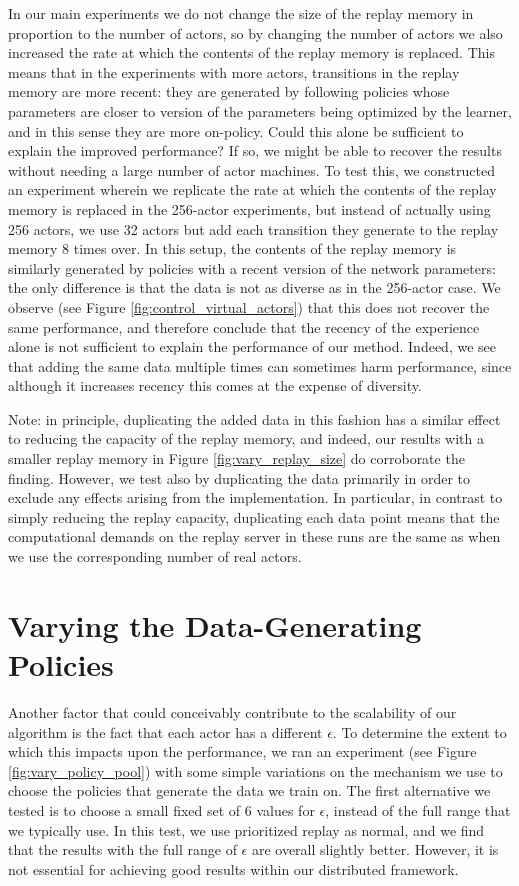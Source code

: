 \documentclass{article} \PassOptionsToPackage{usenames,dvipsnames}{xcolor}
\begin{document}
In our main experiments we do not change the size of the replay memory in proportion to the number of actors, so by changing the number of actors we also increased the rate at which the contents of the replay memory is replaced. This means that in the experiments with more actors, transitions in the replay memory are more recent: they are generated by following policies whose parameters are closer to version of the parameters being optimized by the learner, and in this sense they are more on-policy. Could this alone be sufficient to explain the improved performance? If so, we might be able to recover the results without needing a large number of actor machines. To test this, we constructed an experiment wherein we replicate the rate at which the contents of the replay memory is replaced in the 256-actor experiments, but instead of actually using 256 actors, we use 32 actors but add each transition they generate to the replay memory 8 times over. In this setup, the contents of the replay memory is similarly generated by policies with a recent version of the network parameters: the only difference is that the data is not as diverse as in the 256-actor case. We observe (see Figure \ref{fig:control_virtual_actors}) that this does not recover the same performance, and therefore conclude that the recency of the experience alone is not sufficient to explain the performance of our method. Indeed, we see that adding the same data multiple times can sometimes harm performance, since although it increases recency this comes at the expense of diversity.

Note: in principle, duplicating the added data in this fashion has a similar effect to reducing the capacity of the replay memory, and indeed, our results with a smaller replay memory in Figure \ref{fig:vary_replay_size} do corroborate the finding. However, we test also by duplicating the data primarily in order to exclude any effects arising from the implementation. In particular, in contrast to simply reducing the replay capacity, duplicating each data point means that the computational demands on the replay server in these runs are the same as when we use the corresponding number of real actors.

\section{Varying the Data-Generating Policies}

Another factor that could conceivably contribute to the scalability of our algorithm is the fact that each actor has a different $\epsilon$. To determine the extent to which this impacts upon the performance, we ran an experiment (see Figure \ref{fig:vary_policy_pool}) with some simple variations on the mechanism we use to choose the policies that generate the data we train on. The first alternative we tested is to choose a small fixed set of 6 values for $\epsilon$, instead of the full range that we typically use. In this test, we use prioritized replay as normal, and we find that the results with the full range of $\epsilon$ are overall slightly better. However, it is not essential for achieving good results within our distributed framework.
\end{document}
